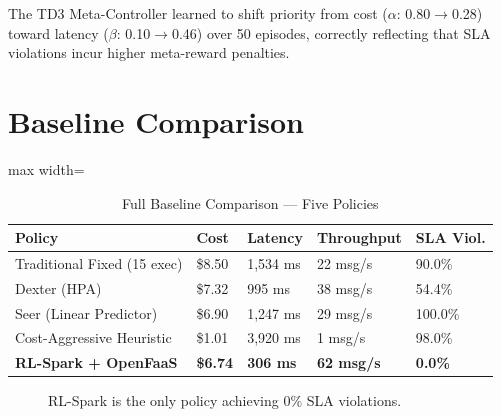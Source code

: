 \noindent The TD3 Meta-Controller learned to shift priority from cost
($\alpha$: 0.80$\to$0.28) toward latency ($\beta$: 0.10$\to$0.46) over 50 episodes,
correctly reflecting that SLA violations incur higher meta-reward penalties.

\section{Baseline Comparison}
\label{sec:baseline}

\begin{table}[H]
\centering
\caption{Full Baseline Comparison --- Five Policies}
\label{tab:baselines}
\begin{adjustbox}{max width=\textwidth}
\begin{tabular}{p{3.6cm}p{1.8cm}p{2.0cm}p{2.2cm}p{1.8cm}}
\toprule
\textbf{Policy} & \textbf{Cost} & \textbf{Latency} & \textbf{Throughput} & \textbf{SLA Viol.} \\
\midrule
Traditional Fixed (15 exec) & \$8.50 & 1,534 ms & 22 msg/s  & 90.0\% \\
Dexter (HPA)                & \$7.32 & 995 ms   & 38 msg/s  & 54.4\% \\
Seer (Linear Predictor)     & \$6.90 & 1,247 ms & 29 msg/s  & 100.0\% \\
Cost-Aggressive Heuristic   & \$1.01 & 3,920 ms & 1 msg/s   & 98.0\% \\
\textbf{RL-Spark + OpenFaaS}& \textbf{\$6.74} & \textbf{306 ms} &
  \textbf{62 msg/s} & \textbf{0.0\%} \\
\bottomrule
\end{tabular}
\end{adjustbox}
\end{table}

\begin{figure}[H]
\centering
{}
\caption{RL-Spark is the only policy achieving 0\% SLA violations.}
\label{fig:sla_bar}
\end{figure}

